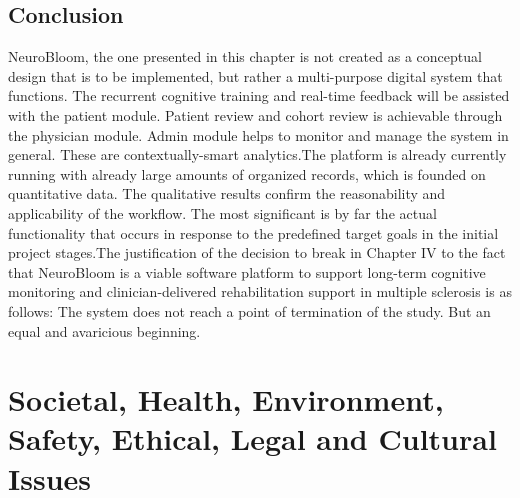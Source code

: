 \documentclass[12pt,a4paper]{report}
\begin{document}
\section{Conclusion}
NeuroBloom, the one presented in this chapter is not created as a conceptual design that is to be implemented, but rather a multi-purpose digital system that functions. The recurrent cognitive training and real-time feedback will be assisted with the patient module. Patient review and cohort review is achievable through the physician module. Admin module helps to monitor and manage the system in general. These are contextually-smart analytics.The platform is already currently running with already large amounts of organized records, which is founded on quantitative data. The qualitative results confirm the reasonability and applicability of the workflow. The most significant is by far the actual functionality that occurs in response to the predefined target goals in the initial project stages.The justification of the decision to break in Chapter IV to the fact that NeuroBloom is a viable software platform to support long-term cognitive monitoring and clinician-delivered rehabilitation support in multiple sclerosis is as follows: The system does not reach a point of termination of the study. But an equal and avaricious beginning.

\chapter{Societal, Health, Environment, Safety, Ethical, Legal and Cultural Issues}
\end{document}
